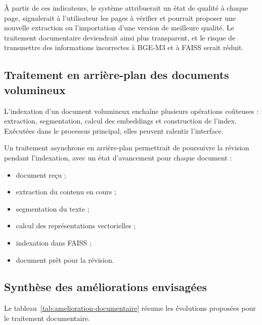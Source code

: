 \documentclass[12pt,a4paper,oneside]{report}
\begin{document}
À partir de ces indicateurs, le système attribuerait un état de qualité à chaque page, signalerait à l'utilisateur les pages à vérifier et pourrait proposer une nouvelle extraction ou l'importation d'une version de meilleure qualité. Le traitement documentaire deviendrait ainsi plus transparent, et le risque de transmettre des informations incorrectes à BGE-M3 et à FAISS serait réduit.

\subsection{Traitement en arrière-plan des documents volumineux}

L'indexation d'un document volumineux enchaîne plusieurs opérations coûteuses : extraction, segmentation, calcul des embeddings et construction de l'index. Exécutées dans le processus principal, elles peuvent ralentir l'interface.

Un traitement asynchrone en arrière-plan permettrait de poursuivre la révision pendant l'indexation, avec un état d'avancement pour chaque document :
\begin{itemize}
  \item document reçu ;
  \item extraction du contenu en cours ;
  \item segmentation du texte ;
  \item calcul des représentations vectorielles ;
  \item indexation dans FAISS ;
  \item document prêt pour la révision.
\end{itemize}

\subsection{Synthèse des améliorations envisagées}

Le tableau~\ref{tab:amelioration-documentaire} résume les évolutions proposées pour le traitement documentaire.
\end{document}
